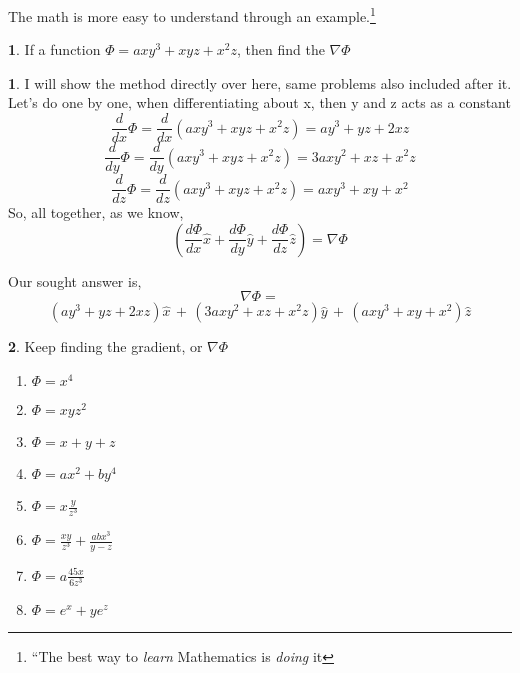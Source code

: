 \documentclass[11pt,a4paper,landscape,twocolumn]{article}
\theoremstyle{definition}
\theoremstyle{definition}
\newtheorem{pr}{ \framebox[0.05\textwidth]{{\sffamily Pr}} }
\theoremstyle{definition}
\theoremstyle{definition}
\newtheorem{sol}{ \framebox[0.05\textwidth]{Sol} }
\begin{document}
The math is more easy to understand through an example.\footnote{``The best way to \emph{learn} Mathematics is \emph{doing} it}

\begin{pr}
If a function $\Phi = axy ^3 + xyz + x^2z$, then find the $ \nabla \Phi $
\end{pr}

\begin{sol}
I will show the method directly over here, same problems also included after it.
\\
Let's do one by one, when differentiating about x, then y and z acts as a constant
\[ \frac{d}{dx} \Phi = \frac{d}{dx} (axy ^3 + xyz + x^2z) = 
	ay^3 + yz + 2xz \]
	\[ \frac{d}{dy} \Phi = \frac{d}{dy} (axy ^3 + xyz + x^2z) =
	3axy^2 + xz + x^2z \]
	\[ \frac{d}{dz} \Phi = \frac{d}{dz} (axy ^3 + xyz + x^2z) =
	axy^3 + xy + x^2 \]
So, all together, as we know,
 \[ \left(	\frac{d \Phi}{dx} \hat{x} + \frac{d \Phi}{dy} \hat{y} + \frac{d \Phi}{dz} \hat{z} \right)  = \nabla \Phi \]	

Our sought answer is,
\[\nabla\Phi = \]
\[ (ay^3 + yz + 2xz) \hat{x} \, + \, (3axy^2 + xz + x^2z) \hat{y} \, + \, (axy^3 + xy + x^2) \hat{z} \]


\end{sol}

\begin{pr}
Keep finding the gradient, or $ \nabla \Phi $ 
\begin{enumerate}
\item $\Phi= x^4 $
\item $\Phi= x y z^2 $
\item $\Phi= x + y +z $
\item $\Phi= ax^2 + by^4$
\item $\Phi= x\frac{y}{z^3}$
\item $\Phi= \frac{xy}{z^3} + \frac{abx^3}{y - z} $
\item $\Phi= a\frac{45x}{6z^3} $
\item $\Phi= e^x + ye^z $
\end{enumerate}
\end{pr}
\end{document}
